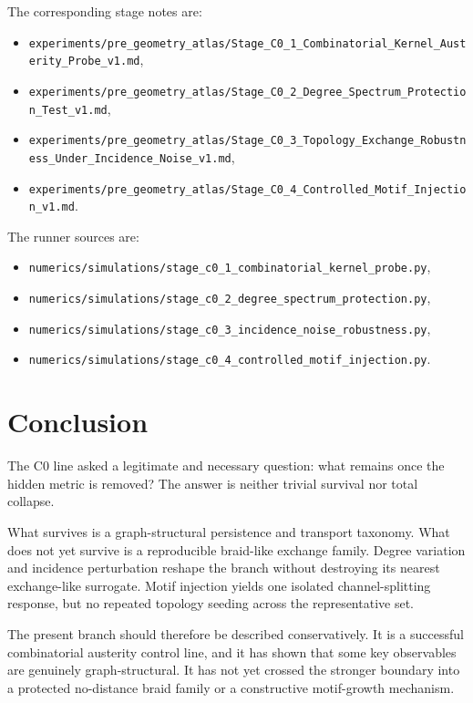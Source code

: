 \documentclass[11pt]{article}
\begin{document}
The corresponding stage notes are:
\begin{itemize}
\item \texttt{experiments/pre\_geometry\_atlas/Stage\_C0\_1\_Combinatorial\_Kernel\_Austerity\_Probe\_v1.md},
\item \texttt{experiments/pre\_geometry\_atlas/Stage\_C0\_2\_Degree\_Spectrum\_Protection\_Test\_v1.md},
\item \texttt{experiments/pre\_geometry\_atlas/Stage\_C0\_3\_Topology\_Exchange\_Robustness\_Under\_Incidence\_Noise\_v1.md},
\item \texttt{experiments/pre\_geometry\_atlas/Stage\_C0\_4\_Controlled\_Motif\_Injection\_v1.md}.
\end{itemize}

The runner sources are:
\begin{itemize}
\item \texttt{numerics/simulations/stage\_c0\_1\_combinatorial\_kernel\_probe.py},
\item \texttt{numerics/simulations/stage\_c0\_2\_degree\_spectrum\_protection.py},
\item \texttt{numerics/simulations/stage\_c0\_3\_incidence\_noise\_robustness.py},
\item \texttt{numerics/simulations/stage\_c0\_4\_controlled\_motif\_injection.py}.
\end{itemize}

\section{Conclusion}

The C0 line asked a legitimate and necessary question: what remains once the hidden metric is removed? The answer is neither trivial survival nor total collapse.

What survives is a graph-structural persistence and transport taxonomy. What does not yet survive is a reproducible braid-like exchange family. Degree variation and incidence perturbation reshape the branch without destroying its nearest exchange-like surrogate. Motif injection yields one isolated channel-splitting response, but no repeated topology seeding across the representative set.

The present branch should therefore be described conservatively. It is a successful combinatorial austerity control line, and it has shown that some key observables are genuinely graph-structural. It has not yet crossed the stronger boundary into a protected no-distance braid family or a constructive motif-growth mechanism.
\end{document}
